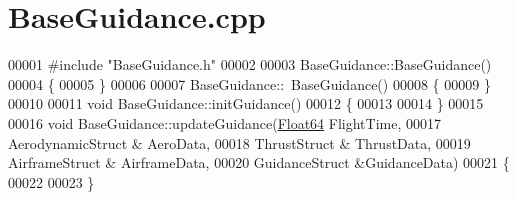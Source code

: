 \hypertarget{_base_guidance_8cpp_source}{}\section{Base\+Guidance.\+cpp}
\label{_base_guidance_8cpp_source}

\begin{DoxyCode}
00001 \textcolor{preprocessor}{#include "BaseGuidance.h"}
00002 
00003 BaseGuidance::BaseGuidance()
00004 \{
00005 \}
00006 
00007 BaseGuidance::~BaseGuidance()
00008 \{
00009 \}
00010 
00011 \textcolor{keywordtype}{void} BaseGuidance::initGuidance()
00012 \{
00013     
00014 \}
00015 
00016 \textcolor{keywordtype}{void} BaseGuidance::updateGuidance(\hyperlink{group___tools_ga3f1431cb9f76da10f59246d1d743dc2c}{Float64} FlightTime, 
00017                                   AerodynamicStruct & AeroData, 
00018                                   ThrustStruct & ThrustData, 
00019                                   AirframeStruct & AirframeData, 
00020                                   GuidanceStruct &GuidanceData)
00021 \{
00022 
00023 \}
\end{DoxyCode}
